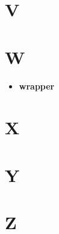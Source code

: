 \chapter{V}
\chapter{W}
	\begin{itemize}
		\item \textbf{wrapper}
	\end{itemize}
\chapter{X}
\chapter{Y}
\chapter{Z}




